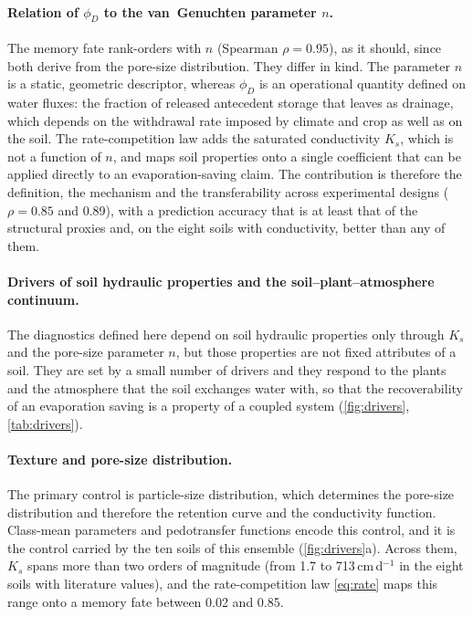 \documentclass[preprint,12pt,authoryear]{elsarticle}
\begin{document}
\paragraph{Relation of $\phi_D$ to the van~Genuchten parameter $n$.} The memory fate rank-orders with $n$ (Spearman $\rho=0.95$), as it should, since both derive from the pore-size distribution. They differ in kind. The parameter $n$ is a static, geometric descriptor, whereas $\phi_D$ is an operational quantity defined on water fluxes: the fraction of released antecedent storage that leaves as drainage, which depends on the withdrawal rate imposed by climate and crop as well as on the soil. The rate-competition law adds the saturated conductivity $K_s$, which is not a function of $n$, and maps soil properties onto a single coefficient that can be applied directly to an evaporation-saving claim. The contribution is therefore the definition, the mechanism and the transferability across experimental designs ($\rho=0.85$ and 0.89), with a prediction accuracy that is at least that of the structural proxies and, on the eight soils with conductivity, better than any of them.

\paragraph{Drivers of soil hydraulic properties and the soil--plant--atmosphere continuum.}
\label{sec:drivers}
The diagnostics defined here depend on soil hydraulic properties only through $K_s$ and the pore-size parameter $n$, but those properties are not fixed attributes of a soil. They are set by a small number of drivers and they respond to the plants and the atmosphere that the soil exchanges water with, so that the recoverability of an evaporation saving is a property of a coupled system (\cref{fig:drivers}, \cref{tab:drivers}).

\paragraph{Texture and pore-size distribution.} The primary control is particle-size distribution, which determines the pore-size distribution and therefore the retention curve and the conductivity function. Class-mean parameters and pedotransfer functions \citep{Carsel1988,Schaap2001,Saxton2006,Weber2024} encode this control, and it is the control carried by the ten soils of this ensemble (\cref{fig:drivers}a). Across them, $K_s$ spans more than two orders of magnitude (from 1.7 to 713\,cm\,d$^{-1}$ in the eight soils with literature values), and the rate-competition law \cref{eq:rate} maps this range onto a memory fate between 0.02 and 0.85.
\end{document}
